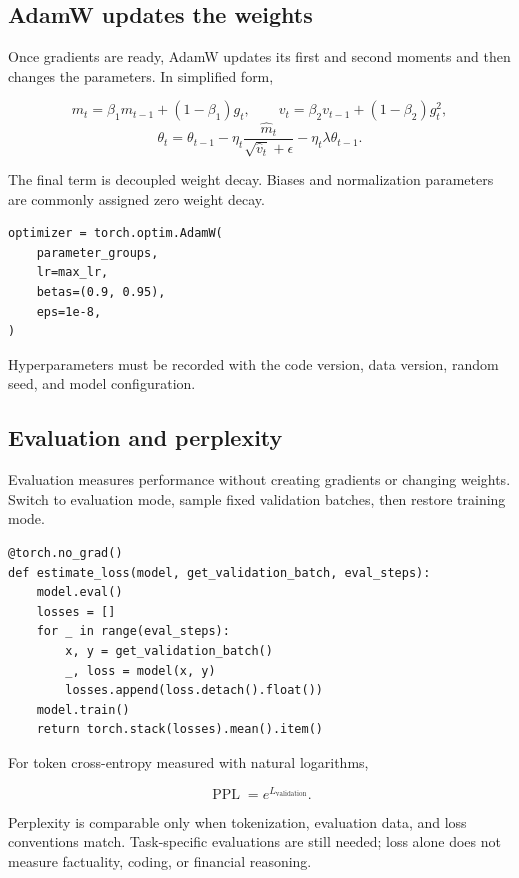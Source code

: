 \subsection{AdamW updates the weights}

Once gradients are ready, AdamW updates its first and second moments and then
changes the parameters. In simplified form,

\[
  m_t=\beta_1m_{t-1}+(1-\beta_1)g_t,
  \qquad
  v_t=\beta_2v_{t-1}+(1-\beta_2)g_t^2,
\]
\[
  \theta_t=\theta_{t-1}
  -\eta_t\frac{\widehat m_t}{\sqrt{\widehat v_t}+\epsilon}
  -\eta_t\lambda\theta_{t-1}.
\]

The final term is decoupled weight decay. Biases and normalization parameters
are commonly assigned zero weight decay.

\begin{lstlisting}[style=shadedpython]
optimizer = torch.optim.AdamW(
    parameter_groups,
    lr=max_lr,
    betas=(0.9, 0.95),
    eps=1e-8,
)
\end{lstlisting}

Hyperparameters must be recorded with the code version, data version, random
seed, and model configuration.

\subsection{Evaluation and perplexity}

Evaluation measures performance without creating gradients or changing
weights. Switch to evaluation mode, sample fixed validation batches, then
restore training mode.

\begin{lstlisting}[style=shadedpython]
@torch.no_grad()
def estimate_loss(model, get_validation_batch, eval_steps):
    model.eval()
    losses = []
    for _ in range(eval_steps):
        x, y = get_validation_batch()
        _, loss = model(x, y)
        losses.append(loss.detach().float())
    model.train()
    return torch.stack(losses).mean().item()
\end{lstlisting}

For token cross-entropy measured with natural logarithms,

\[
  \operatorname{PPL}=e^{L_{\text{validation}}}.
\]

Perplexity is comparable only when tokenization, evaluation data, and loss
conventions match. Task-specific evaluations are still needed; loss alone
does not measure factuality, coding, or financial reasoning.

